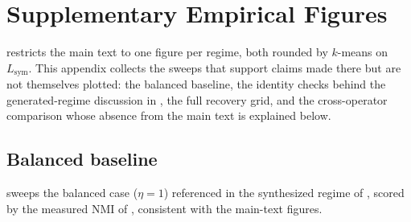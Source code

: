 %
\section{Supplementary Empirical Figures}\label{app:emp-extra}

 restricts the main text to one figure per regime, both
rounded by $k$-means on $L_{\mathrm{sym}}$. This appendix collects the sweeps
that support claims made there but are not themselves plotted: the balanced
baseline, the identity checks behind
the generated-regime discussion in , the full recovery grid, and the
cross-operator comparison whose absence from the main text is explained
below.

\subsection*{Balanced baseline}
 sweeps the balanced case ($\eta=1$) referenced in
the synthesized regime of , scored by the measured NMI of , consistent
with the main-text figures.

